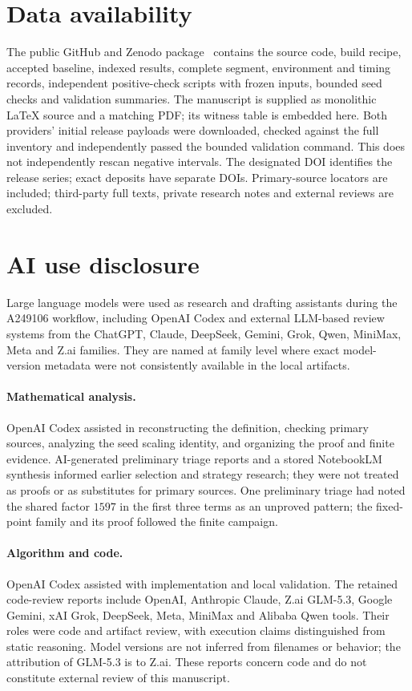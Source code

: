 \documentclass[11pt,a4paper]{article}
\theoremstyle{remark}
\begin{document}
\section{Data availability}
The public GitHub and Zenodo package~\cite{project} contains the source code,
build recipe, accepted baseline, indexed results, complete segment,
environment and timing records, independent positive-check scripts with
frozen inputs, bounded seed checks and validation summaries. The manuscript
is supplied as monolithic LaTeX source and a matching PDF; its witness table
is embedded here. Both providers' initial release payloads were downloaded,
checked against the full inventory and independently passed the bounded
validation command. This does not independently rescan negative intervals.
The designated DOI identifies the release series; exact deposits have
separate DOIs. Primary-source locators are included; third-party full texts,
private research notes and external reviews are excluded.

\section{AI use disclosure}
Large language models were used as research and drafting assistants during
the A249106 workflow, including OpenAI Codex and external LLM-based review
systems from the ChatGPT, Claude, DeepSeek, Gemini, Grok, Qwen, MiniMax,
Meta and Z.ai families. They are named at family level where exact
model-version metadata were not consistently available in the local artifacts.
\paragraph{Mathematical analysis.}
OpenAI Codex assisted in reconstructing the definition, checking primary
sources, analyzing the seed scaling identity, and organizing the proof and
finite evidence. AI-generated preliminary triage reports and a stored
NotebookLM synthesis informed earlier selection and strategy research;
they were not treated as proofs or as substitutes for primary sources.
One preliminary triage had noted the shared factor $1597$ in the first three
terms as an unproved pattern; the fixed-point family and its proof followed
the finite campaign.

\paragraph{Algorithm and code.}
OpenAI Codex assisted with implementation and local validation. The retained
code-review reports include OpenAI, Anthropic Claude, Z.ai GLM-5.3, Google
Gemini, xAI Grok, DeepSeek, Meta, MiniMax and Alibaba Qwen tools. Their roles
were code and artifact review, with execution claims distinguished from
static reasoning. Model versions are not inferred from filenames or behavior;
the attribution of GLM-5.3 is to Z.ai. These reports concern code and do not
constitute external review of this manuscript.
\end{document}
